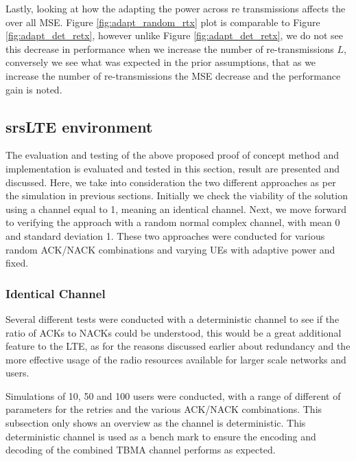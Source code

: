 \documentclass{article}
\begin{document}


Lastly, looking at how the adapting the power across re transmissions affects the over all MSE. Figure \ref{fig:adapt_random_rtx} plot is comparable to Figure \ref{fig:adapt_det_retx}, however unlike Figure \ref{fig:adapt_det_retx}, we do not see this decrease in performance when we increase the number of re-transmissions $L$, conversely we see what was expected in the prior assumptions, that as we increase the number of re-transmissions the MSE decrease and the performance gain is noted. 



\subsection{srsLTE environment}
The evaluation and testing of the above proposed proof of concept method and implementation is evaluated and tested in this section, result are presented and discussed. Here, we take into consideration the two different approaches as per the simulation in previous sections. Initially we check the viability of the solution using a channel equal to 1, meaning an identical channel. Next, we move forward to verifying the approach with a random normal complex channel, with mean 0 and standard deviation 1. These two approaches were conducted for various random ACK/NACK combinations and varying UEs with adaptive power and fixed. 

\subsubsection{Identical Channel}
Several different tests were conducted with a deterministic channel to see if the ratio of ACKs to NACKs could be understood, this would be a great additional feature to the LTE, as for the reasons discussed earlier about redundancy and the more effective usage of the radio resources available for larger scale networks and users. 

Simulations of 10, 50 and 100 users were conducted, with a range of different of parameters for the retries and the various ACK/NACK combinations. This subsection only shows an overview as the channel is deterministic. This deterministic channel is used as a bench mark to ensure the encoding and decoding of the combined TBMA channel performs as expected. 
\end{document}
